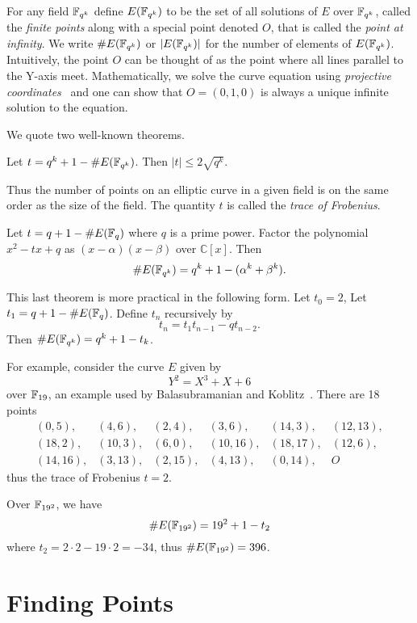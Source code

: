 For any field $\mathbb{F}_{q^k}$ define $E(\mathbb{F}_{q^k})$ to be the set of all solutions of $E$
over $\mathbb{F}_{q^k}$, called the \emph{finite points} along with a special point denoted
$O$, that is called the \emph{point at infinity}. We write $\#E(\mathbb{F}_{q^k})$ or
$|E(\mathbb{F}_{q^k})|$ for the number of elements of $E(\mathbb{F}_{q^k})$. Intuitively, the point $O$
can be thought of as the point where all lines parallel to the Y-axis meet.
Mathematically, we solve the curve equation using \emph{projective
coordinates}~\cite{realprojectiveplane} and one can show that $O = (0,1,0)$ is
always a unique infinite solution to the equation.

We quote two well-known theorems.

\begin{theorem}
[Hasse] Let $t = q^k + 1 - \#E(\mathbb{F}_{q^k})$.
Then $|t| \le 2\sqrt{q^k}$.
\end{theorem}

Thus the number of points on an elliptic curve in a given field is on the same
order as the size of the field. The quantity $t$ is called the \emph{trace of
Frobenius}.

\begin{theorem}
[Weil] Let $t = q + 1 - \#E(\mathbb{F}_q)$
where $q$ is a prime power.
Factor the polynomial $x^2 - t x + q$ as $(x-\alpha)(x-\beta)$ over
$\mathbb{C}[x]$.
Then
\[ \#E(\mathbb{F}_{q^k}) = q^k + 1 - (\alpha^k + \beta^k) .\]
\end{theorem}

This last theorem is more practical in the following form. Let $t_0 = 2$,
Let $t_1 = q + 1 - \#E(\mathbb{F}_q)$.
Define $t_n$ recursively by
\[ t_n = t_1 t_{n-1} - q t_{n-2} .\]
Then $\#E(\mathbb{F}_{q^k}) = q^k + 1 - t_k$.

For example, consider the curve $E$ given by
\[ Y^2 = X^3 + X + 6 \]
over $\mathbb{F}_{19}$, an example used by Balasubramanian and Koblitz~\cite{bk}.
There are 18 points
\[
\begin{array}{llllll}
(0,5), & (4,6), & (2,4), & (3,6), & (14,3), & (12,13), \\
(18,2), & (10,3), & (6,0), & (10,16), & (18, 17), & (12,6), \\
(14,16), & (3,13), & (2,15), & (4,13), & (0,14), & O
\end{array}
\]
thus the trace of Frobenius $t = 2$.

Over $\mathbb{F}_{{19}^2}$, we have
\[
\#E(\mathbb{F}_{{19}^2}) = 19^2 + 1 - t_2
\]
where $t_2 = 2\cdot 2 - 19 \cdot 2 = -34$, thus
$\#E(\mathbb{F}_{{19}^2}) = 396$.

\section {Finding Points}

